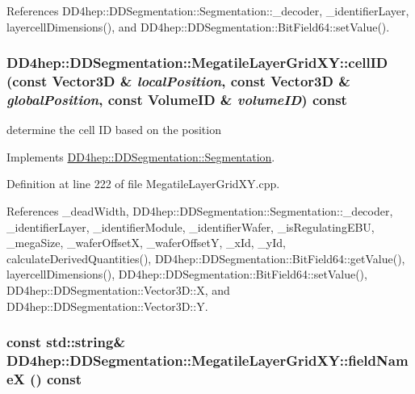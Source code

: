 References DD4hep::DDSegmentation::Segmentation::\_\-decoder, \_\-identifierLayer, layercellDimensions(), and DD4hep::DDSegmentation::BitField64::setValue().\hypertarget{class_d_d4hep_1_1_d_d_segmentation_1_1_megatile_layer_grid_x_y_abb23df6fd5f38a8324dd3711f0e452bf}{
\subsubsection[{cellID}]{ DD4hep::DDSegmentation::MegatileLayerGridXY::cellID (const {\bf Vector3D} \& {\em localPosition}, \/  const {\bf Vector3D} \& {\em globalPosition}, \/  const {\bf VolumeID} \& {\em volumeID}) const}}
\label{class_d_d4hep_1_1_d_d_segmentation_1_1_megatile_layer_grid_x_y_abb23df6fd5f38a8324dd3711f0e452bf}


determine the cell ID based on the position 

Implements \hyperlink{class_d_d4hep_1_1_d_d_segmentation_1_1_segmentation_ad5a60953d96d409850d8192f64f8ce3c}{DD4hep::DDSegmentation::Segmentation}.

Definition at line 222 of file MegatileLayerGridXY.cpp.

References \_\-deadWidth, DD4hep::DDSegmentation::Segmentation::\_\-decoder, \_\-identifierLayer, \_\-identifierModule, \_\-identifierWafer, \_\-isRegulatingEBU, \_\-megaSize, \_\-waferOffsetX, \_\-waferOffsetY, \_\-xId, \_\-yId, calculateDerivedQuantities(), DD4hep::DDSegmentation::BitField64::getValue(), layercellDimensions(), DD4hep::DDSegmentation::BitField64::setValue(), DD4hep::DDSegmentation::Vector3D::X, and DD4hep::DDSegmentation::Vector3D::Y.\hypertarget{class_d_d4hep_1_1_d_d_segmentation_1_1_megatile_layer_grid_x_y_a15c6f89a44d2618eb41362e8467dd80c}{
\subsubsection[{fieldNameX}]{\setlength{\rightskip}{0pt plus 5cm}const std::string\& DD4hep::DDSegmentation::MegatileLayerGridXY::fieldNameX () const}}
\label{class_d_d4hep_1_1_d_d_segmentation_1_1_megatile_layer_grid_x_y_a15c6f89a44d2618eb41362e8467dd80c}


